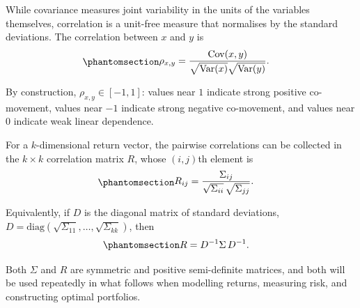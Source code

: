 \documentclass[
  letterpaper,
  DIV=11,
  numbers=noendperiod]{scrreprt}
\begin{document}

While covariance measures joint variability in the units of the
variables themselves, correlation is a unit-free measure that normalises
by the standard deviations. The correlation between \(x\) and \(y\) is
\begin{equation}\protect\phantomsection\label{eq-gen-0080}{  
\begin{align}
    \rho_{x,y}
    &= \frac{\mathrm{Cov}(x,y)}
             {\sqrt{\mathrm{Var}(x)}\sqrt{\mathrm{Var}(y)}}.
\end{align}
}\end{equation}

By construction, \(\rho_{x,y} \in [-1,1]\): values near \(1\) indicate
strong positive co-movement, values near \(-1\) indicate strong negative
co-movement, and values near \(0\) indicate weak linear dependence.

For a \(k\)-dimensional return vector, the pairwise correlations can be
collected in the \(k\times k\) correlation matrix \(R\), whose
\((i,j)\)th element is
\begin{equation}\protect\phantomsection\label{eq-gen-0081}{  
\begin{align}
    R_{ij}
    &= \frac{\Sigma_{ij}}
             {\sqrt{\Sigma_{ii}}\,\sqrt{\Sigma_{jj}}}.
\end{align}
}\end{equation}

Equivalently, if \(D\) is the diagonal matrix of standard deviations,
\(D = \mathrm{diag}(\sqrt{\Sigma_{11}},\ldots,\sqrt{\Sigma_{kk}})\),
then \begin{equation}\protect\phantomsection\label{eq-gen-0082}{  
\begin{align}
    R &= D^{-1} \Sigma \, D^{-1}.
\end{align}
}\end{equation}

Both \(\Sigma\) and \(R\) are symmetric and positive semi-definite
matrices, and both will be used repeatedly in what follows when
modelling returns, measuring risk, and constructing optimal portfolios.
\end{document}
